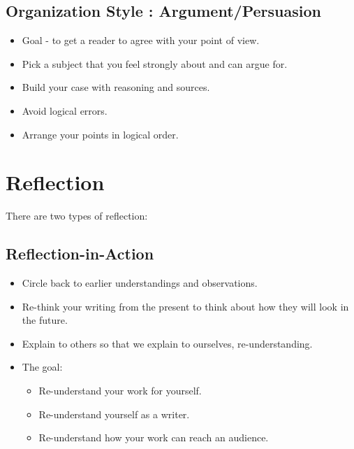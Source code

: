 \documentclass[12pt]{article}
\begin{document}
    \subsection{Organization Style : Argument/Persuasion}
    \begin{itemize}
        \item Goal - to get a reader to agree with your point of view.
	\item Pick a subject that you feel strongly about and can argue for.
	\item Build your case with reasoning and sources.
	\item Avoid logical errors.
	\item Arrange your points in logical order.
    \end{itemize}

    \newpage
    \section{Reflection}
    There are two types of reflection:

    \subsection{Reflection-in-Action}
    \begin{itemize}
        \item Circle back to earlier understandings and observations.
	\item Re-think your writing from the present to think about how they will look in the future.
	\item Explain to others so that we explain to ourselves, re-understanding.
	\item The goal:
	\begin{itemize}
	    \item Re-understand your work for yourself.
            \item Re-understand yourself as a writer.
	    \item Re-understand how your work can reach an audience.
        \end{itemize}
    \end{itemize}
\end{document}
